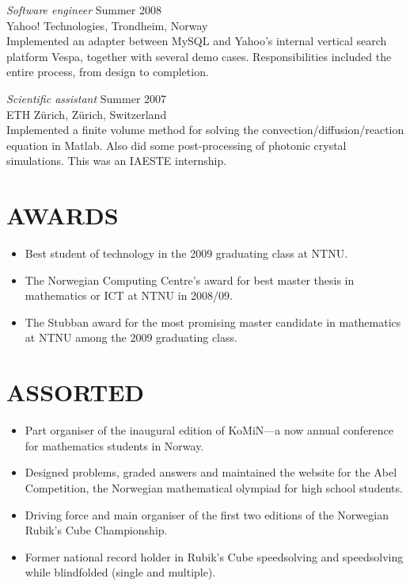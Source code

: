 \documentclass[line,margin]{res}
\newcommand{\zh}{Z\"{u}rich}
\begin{document}
\begin{resume}
    {\em Software engineer} \hfill Summer 2008 \\
    Yahoo! Technologies, Trondheim, Norway \\
    Implemented an adapter between MySQL and Yahoo's internal vertical search platform Vespa, together with
    several demo cases. Responsibilities included the entire process, from design to completion.

    {\em Scientific assistant} \hfill Summer 2007 \\
    ETH \zh, \zh, Switzerland \\
    Implemented a finite volume method for solving the convection/diffusion/reaction equation in Matlab. Also
    did some post-processing of photonic crystal simulations. This was an IAESTE internship.


\section{AWARDS}
    \begin{itemize}
        \item Best student of technology in the 2009 graduating class at NTNU.
        \item The Norwegian Computing Centre's award for best master thesis in mathematics or ICT at NTNU in
            2008/09.
        \item The Stubban award for the most promising master candidate in mathematics at NTNU among the 2009
            graduating class.
    \end{itemize}


\newpage


\section{ASSORTED}
    \begin{itemize}
        \item Part organiser of the inaugural edition of KoMiN---a now annual conference for mathematics
            students in Norway.
        \item Designed problems, graded answers and maintained the website for the Abel Competition, the
            Norwegian mathematical olympiad for high school students.
        \item Driving force and main organiser of the first two editions of the Norwegian Rubik's Cube
            Championship.
        \item Former national record holder in Rubik's Cube speedsolving and speedsolving while blindfolded
            (single and multiple).
    \end{itemize}



\end{resume}
\end{document}
